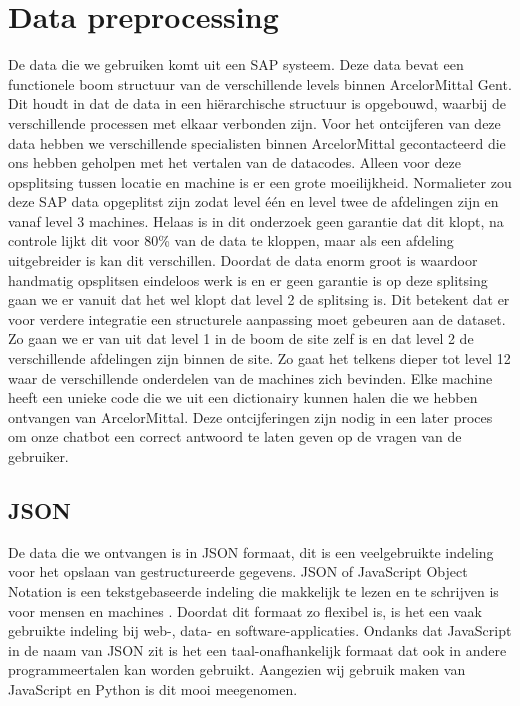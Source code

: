 \section{Data preprocessing}
De data die we gebruiken komt uit een SAP systeem. Deze data bevat een functionele boom structuur van de verschillende levels binnen ArcelorMittal Gent.
Dit houdt in dat de data in een hiërarchische structuur is opgebouwd, waarbij de verschillende processen met elkaar verbonden zijn.
Voor het ontcijferen van deze data hebben we verschillende specialisten binnen ArcelorMittal gecontacteerd die ons hebben geholpen met het vertalen van de datacodes.
Alleen voor deze opsplitsing tussen locatie en machine is er een grote moeilijkheid. Normalieter zou deze SAP data opgeplitst zijn zodat level één en level twee de afdelingen zijn en vanaf level 3 machines. 
Helaas is in dit onderzoek geen garantie dat dit klopt, na controle lijkt dit voor 80\% van de data te kloppen, maar als een afdeling uitgebreider is kan dit verschillen.
Doordat de data enorm groot is waardoor handmatig opsplitsen eindeloos werk is en er geen garantie is op deze splitsing gaan we er vanuit dat het wel klopt dat level 2 de splitsing is. 
Dit betekent dat er voor verdere integratie een structurele aanpassing moet gebeuren aan de dataset.
Zo gaan we er van uit dat level 1 in de boom de site zelf is en dat level 2 de verschillende afdelingen zijn binnen de site. Zo gaat het telkens dieper tot level 12 waar de verschillende onderdelen van de machines zich bevinden.
Elke machine heeft een unieke code die we uit een dictionairy kunnen halen die we hebben ontvangen van ArcelorMittal.
Deze ontcijferingen zijn nodig in een later proces om onze chatbot een correct antwoord te laten geven op de vragen van de gebruiker.

\subsection{JSON}
De data die we ontvangen is in JSON formaat, dit is een veelgebruikte indeling voor het opslaan van gestructureerde gegevens.
JSON of JavaScript Object Notation is een tekstgebaseerde indeling die makkelijk te lezen en te schrijven is voor mensen en machines \autocite{Erickson2024}.
Doordat dit formaat zo flexibel is, is het een vaak gebruikte indeling bij web-, data- en software-applicaties.
Ondanks dat JavaScript in de naam van JSON zit is het een taal-onafhankelijk formaat dat ook in andere programmeertalen kan worden gebruikt.
Aangezien wij gebruik maken van JavaScript en Python is dit mooi meegenomen.


